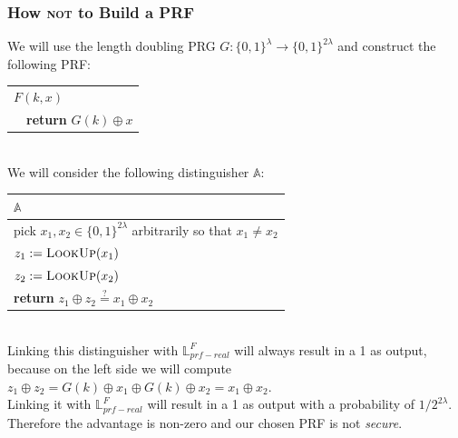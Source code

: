 \documentclass{article}
\begin{document}
\begin{adjustwidth}{2em}{2em}
\begin{adjustwidth}{2em}{2em}
				\subsubsection{How \textsc{not} to Build a PRF}
				\begin{adjustwidth}{2em}{}
					We will use the length doubling PRG $G: \{ 0,1 \} ^{\lambda} \rightarrow \{ 0,1 \} ^{2\lambda}$ and construct the following PRF: \\
					\begin{center}
						\begin{tabular}{|l|}
							\hline
							\underline{$F(k,x)$} \\
							\ \ \textbf{return} $G(k) \oplus x$ \\
							\hline
						\end{tabular}
					\end{center}
					\hfill \\
					We will consider the following distinguisher $\mathbb{A}$: \\
					\begin{center}
						\begin{tabular}{|l|}
							\hline
							\cellcolor{gray!80} $\mathbb{A}$ \\
							\hline
							pick $x_1 , x_2 \in \{ 0,1 \} ^{2\lambda}$ arbitrarily so that $x_1 \neq x_2$ \\
							$z_1 := \textsc{LookUp}(x_1)$ \\
							$z_2 := \textsc{LookUp}(x_2)$ \\
							\textbf{return} $z_1 \oplus z_2 \stackrel{?}{=} x_1 \oplus x_2$ \\
							\hline
						\end{tabular}
					\end{center}
					\hfill \\
					Linking this distinguisher with $\mathbb{L}_{prf-real}^F$ will always result in a 1 as output, because on the left side we will compute $z_1 \oplus z_2 = G(k) \oplus x_1 \oplus G(k) \oplus x_2 = x_1 \oplus x_2$. \\
					Linking it with $\mathbb{L}_{prf-real}^F$ will result in a 1 as output with a probability of $1/2^{2\lambda}$. \\
					Therefore the advantage is non-zero and our chosen PRF is not \textit{secure}.
				\end{adjustwidth}
			\end{adjustwidth}

\end{adjustwidth}
\end{document}
